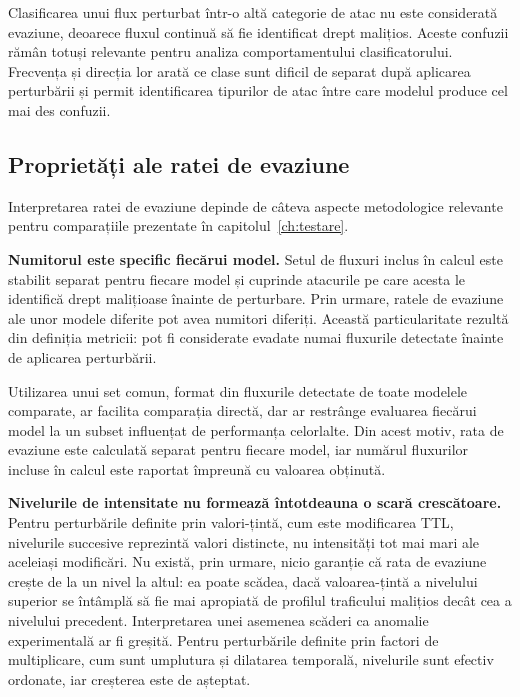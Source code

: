 Clasificarea unui flux perturbat într-o altă categorie de atac nu este considerată evaziune, deoarece fluxul continuă să fie identificat drept malițios. Aceste confuzii rămân totuși relevante pentru analiza comportamentului clasificatorului. Frecvența și direcția lor arată ce clase sunt dificil de separat după aplicarea perturbării și permit identificarea tipurilor de atac între care modelul produce cel mai des confuzii.


\subsection{Proprietăți ale ratei de evaziune}\label{subsec:proprietati}

Interpretarea ratei de evaziune depinde de câteva aspecte metodologice relevante pentru comparațiile prezentate în capitolul~\ref{ch:testare}.

\textbf{Numitorul este specific fiecărui model.}
Setul de fluxuri inclus în calcul este stabilit separat pentru fiecare model și cuprinde atacurile pe care acesta le identifică drept malițioase înainte de perturbare. Prin urmare, ratele de evaziune ale unor modele diferite pot avea numitori diferiți. Această particularitate rezultă din definiția metricii: pot fi considerate evadate numai fluxurile detectate înainte de aplicarea perturbării.

Utilizarea unui set comun, format din fluxurile detectate de toate modelele comparate, ar facilita comparația directă, dar ar restrânge evaluarea fiecărui model la un subset influențat de performanța celorlalte. Din acest motiv, rata de evaziune este calculată separat pentru fiecare model, iar numărul fluxurilor incluse în calcul este raportat împreună cu valoarea obținută.

\textbf{Nivelurile de intensitate nu formează întotdeauna o scară crescătoare.} Pentru perturbările definite prin valori-țintă, cum este modificarea TTL, nivelurile succesive reprezintă valori distincte, nu intensități tot mai mari ale aceleiași modificări. Nu există, prin urmare, nicio garanție că rata de evaziune crește de la un nivel la altul: ea poate scădea, dacă valoarea-țintă a nivelului superior se întâmplă să fie mai apropiată de profilul traficului malițios decât cea a nivelului precedent. Interpretarea unei asemenea scăderi ca anomalie experimentală ar fi greșită. Pentru perturbările definite prin factori de multiplicare, cum sunt umplutura și dilatarea temporală, nivelurile sunt efectiv ordonate, iar creșterea este de așteptat.

